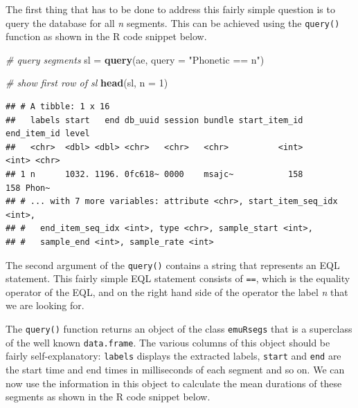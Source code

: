 \documentclass[]{book}
\newenvironment{Shaded}{\begin{snugshade}}{\end{snugshade}}
\newcommand{\CommentTok}[1]{\textcolor[rgb]{0.56,0.35,0.01}{\textit{#1}}}
\newcommand{\DataTypeTok}[1]{\textcolor[rgb]{0.13,0.29,0.53}{#1}}
\newcommand{\DecValTok}[1]{\textcolor[rgb]{0.00,0.00,0.81}{#1}}
\newcommand{\KeywordTok}[1]{\textcolor[rgb]{0.13,0.29,0.53}{\textbf{#1}}}
\newcommand{\NormalTok}[1]{#1}
\newcommand{\OperatorTok}[1]{\textcolor[rgb]{0.81,0.36,0.00}{\textbf{#1}}}
\newcommand{\StringTok}[1]{\textcolor[rgb]{0.31,0.60,0.02}{#1}}
\begin{document}
The first thing that has to be done to address this fairly simple question is to query the database for all \emph{n} segments. This can be achieved using the \texttt{query()} function as shown in the R code snippet below.

\begin{Shaded}
\begin{Highlighting}[]
\CommentTok{# query segments}
\NormalTok{sl =}\StringTok{ }\KeywordTok{query}\NormalTok{(ae, }\DataTypeTok{query =} \StringTok{"Phonetic == n"}\NormalTok{)}

\CommentTok{# show first row of sl}
\KeywordTok{head}\NormalTok{(sl, }\DataTypeTok{n =} \DecValTok{1}\NormalTok{)}
\end{Highlighting}
\end{Shaded}

\begin{verbatim}
## # A tibble: 1 x 16
##   labels start   end db_uuid session bundle start_item_id end_item_id level
##   <chr>  <dbl> <dbl> <chr>   <chr>   <chr>          <int>       <int> <chr>
## 1 n      1032. 1196. 0fc618~ 0000    msajc~           158         158 Phon~
## # ... with 7 more variables: attribute <chr>, start_item_seq_idx <int>,
## #   end_item_seq_idx <int>, type <chr>, sample_start <int>,
## #   sample_end <int>, sample_rate <int>
\end{verbatim}

The second argument of the \texttt{query()} contains a string that represents an EQL statement. This fairly simple EQL statement consists of \texttt{==}, which is the equality operator of the EQL, and on the right hand side of the operator the label \emph{n} that we are looking for.

The \texttt{query()} function returns an object of the class \texttt{emuRsegs} that is a superclass of the well known \texttt{data.frame}. The various columns of this object should be fairly self-explanatory: \texttt{labels} displays the extracted labels, \texttt{start} and \texttt{end} are the start time and end times in milliseconds of each segment and so on. We can now use the information in this object to calculate the mean durations of these segments as shown in the R code snippet below.

\begin{Shaded}
\end{Shaded}
\end{document}
